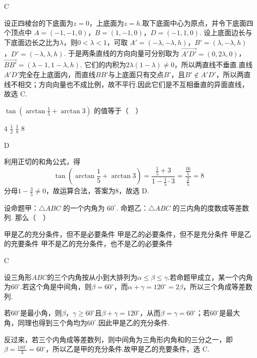\documentclass[UTF8,a4paper,oneside,11pt]{ctexbook}
\begin{document}
\begin{answer}
C
\end{answer}

\begin{solution}
设正四棱台的下底面为\(z=0\)，上底面为\(z=h\).取下底面中心为原点，并令下底面四个顶点中
\(A=(-1,-1,0)\)，\(B=(1,-1,0)\)，\(D=(-1,1,0)\).
设上底面边长与下底面边长之比为\(\lambda\)，则\(0<\lambda<1\)，可取
\(A'=(-\lambda,-\lambda,h)\)，\(B'=(\lambda,-\lambda,h)\)，\(D'=(-\lambda,\lambda,h)\).
于是两条直线的方向向量可分别取为
\(\overrightarrow{A'D'}=(0,2\lambda,0)\)，\(\overrightarrow{BB'}=(\lambda-1,1-\lambda,h)\).
它们的内积为\(2\lambda(1-\lambda)\ne0\)，所以两直线不垂直.直线\(A'D'\)完全在上底面内，而直线\(BB'\)与上底面只有交点\(B'\)，且\(B'\notin A'D'\)，所以两直线不相交；方向向量也不成比例，故不平行.因此它们是不互相垂直的异面直线，故选 C.
\end{solution}

\begin{problem}

\(\tan \left(\arctan \frac{1}{5}+\arctan 3\right)\) 的值等于（\(\quad\)）

\choices
    {\(4\)}
    {\(\frac{1}{2}\)}
    {\(\frac{1}{8}\)}
    {\(8\)}
\end{problem}

\begin{answer}
D
\end{answer}

\begin{solution}
利用正切的和角公式，得
\[
\tan\left(\arctan\frac{1}{5}+\arctan 3\right)
=\frac{\frac{1}{5}+3}{1-\frac{1}{5}\cdot3}
=\frac{\frac{16}{5}}{\frac{2}{5}}=8
\]
分母\(1-\frac{3}{5}\ne0\)，故运算合法，答案为\(8\)，故选 D.
\end{solution}

\begin{problem}

设命题甲：\(\triangle ABC\) 的一个内角为 \(60^{\circ}\). 命题乙：\(\triangle ABC\) 的三内角的度数成等差数列. 那么（\(\quad\)）

\choices
    {甲是乙的充分条件，但不是必要条件}
    {甲是乙的必要条件，但不是充分条件}
    {甲是乙的充要条件}
    {甲不是乙的充分条件，也不是乙的必要条件}
\end{problem}

\begin{answer}
C
\end{answer}

\begin{solution}
设三角形\(ABC\)的三个内角按从小到大排列为\(\alpha\le\beta\le\gamma\).若命题甲成立，某一个内角为\(60^{\circ}\).若这个角是中间角，则\(\beta=60^{\circ}\)，而\(\alpha+\gamma=120^{\circ}=2\beta\)，所以三个角成等差数列.

若\(60^{\circ}\)是最小角，则\(\beta\)，\(\gamma\ge60^{\circ}\)且\(\beta+\gamma=120^{\circ}\)，从而\(\beta=\gamma=60^{\circ}\)；若\(60^{\circ}\)是最大角，同理也得到三个角均为\(60^{\circ}\).因此甲是乙的充分条件.

反过来，若三个内角成等差数列，则中间角为三角形内角和的三分之一，即\(\beta=\frac{180^{\circ}}{3}=60^{\circ}\)，所以乙是甲的充分条件.故甲是乙的充要条件，选 C.
\end{solution}
\end{document}
